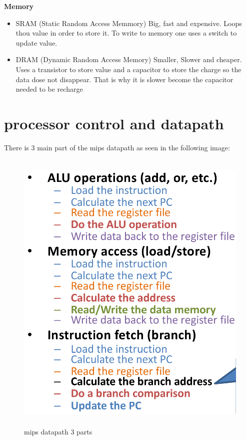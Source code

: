 \textbf{Memory}
\begin{itemize}
\item  SRAM (Static Random Access Memmory) Big, fast and expensive. Loops thou value in order to store it.
  To write to memory one uses a switch to update value.
\item  DRAM (Dynamic Random Access Memory) Smaller, Slower and cheaper. Uses a transistor to store value
  and a capacitor to store the charge so the data dose not disappear.
  That is why it is slower become the capacitor needed to be recharge
\end{itemize}


\newpage


\section{processor control and datapath}
There is 3 main part of the mips datapath as seen in the following image:
\begin{figure}[h]
    \vspace{10mm}
    \centering
    \includegraphics[width=12cm, height=14cm]{image/mips-datapath-3parts.png} 
    \caption{mips datapath 3 parts}
    \label{mips-datapath-3parts}
\end{figure}


